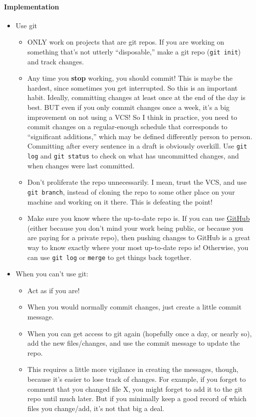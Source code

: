 \documentclass[11pt]{article}
\begin{document}
\paragraph{Implementation}
\label{sec-3-2-3-2}

\begin{itemize}
\item Use git
\begin{itemize}
\item ONLY work on projects that are git repos.  If you are working on something that's not utterly ``disposable,'' make a git repo (\texttt{git init}) and track changes.
\item Any time you \textbf{stop} working, you should commit! This is maybe the hardest, since sometimes you get interrupted.  So this is an important habit.  Ideally, committing changes at least once at the end of the day is best.  BUT even if you only commit changes once a week, it's a big improvement on not using a VCS!  So I think in practice, you need to commit changes on a regular-enough schedule that corresponds to ``significant additions,'' which may be defined differently person to person.  Committing after every sentence in a draft is obviously overkill.  Use \texttt{git log} and \texttt{git status} to check on what has uncommitted changes, and when changes were last committed.
\item Don't proliferate the repo unnecessarily.  I mean, trust the VCS, and use \texttt{git branch}, instead of cloning the repo to some other place on your machine and working on it there. This is defeating the point!
\item Make sure you know where the up-to-date repo is.  If you can use \href{https://github.com/}{GitHub} (either because you don't mind your work being public, or because you are paying for a private repo), then pushing changes to GitHub is a great way to know exactly where your most up-to-date repo is!  Otherwise, you can use \texttt{git log} or \texttt{merge} to get things back together.
\end{itemize}
\item When you can't use git:
\begin{itemize}
\item Act as if you are!
\item When you would normally commit changes, just create a little commit message.
\item When you can get access to git again (hopefully once a day, or nearly so), add the new files/changes, and use the commit message to update the repo.
\item This requires a little more vigilance in creating the messages, though, because it's easier to lose track of changes.  For example, if you forget to comment that you changed file X, you might forget to add it to the git repo until much later.  But if you minimally keep a good record of which files you change/add, it's not that big a deal.
\end{itemize}
\end{itemize}
\end{document}
